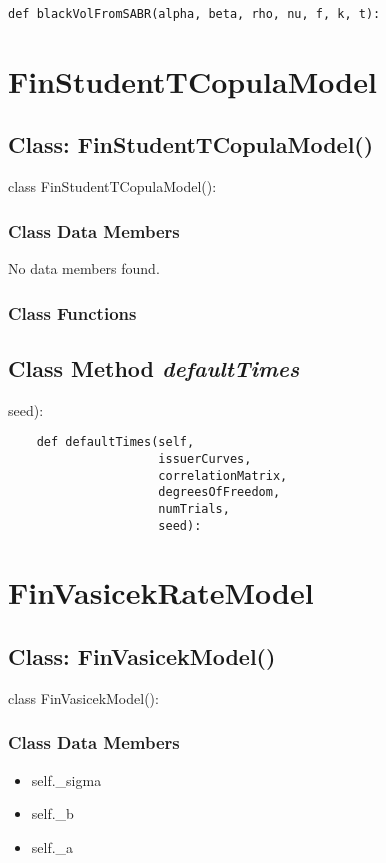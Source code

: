 \documentclass[twoside,11pt]{book}
\begin{document}
\begin{lstlisting}
def blackVolFromSABR(alpha, beta, rho, nu, f, k, t):
\end{lstlisting}

\newpage
\section{FinStudentTCopulaModel}

\subsection{Class: FinStudentTCopulaModel()}
class FinStudentTCopulaModel():

\subsubsection{Class Data Members}
No data members found.

\subsubsection{Class Functions}

\subsection{Class Method {\it defaultTimes}}
seed):

\begin{lstlisting}
    def defaultTimes(self,
                     issuerCurves,
                     correlationMatrix,
                     degreesOfFreedom,
                     numTrials,
                     seed):
\end{lstlisting}

\newpage
\section{FinVasicekRateModel}

\subsection{Class: FinVasicekModel()}
class FinVasicekModel():

\subsubsection{Class Data Members}
\begin{itemize}
\item{self.\_sigma}
\item{self.\_b}
\item{self.\_a}
\end{itemize}
\end{document}
